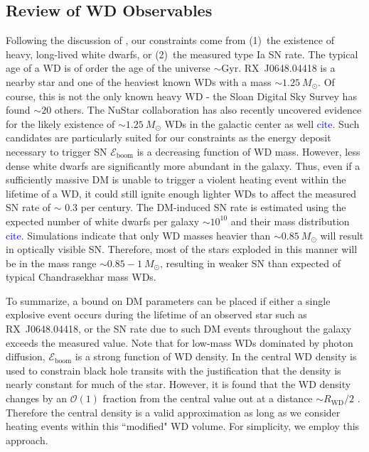 \documentclass[twocolumn,showpacs,preprintnumbers,amsmath,amssymb,prd]{revtex4}
\newcommand{\Eboom}{\mathcal{E}_\text{boom}}
\newcommand{\OO}{\mathcal{O}}
\begin{document}
\subsection{Review of WD Observables}
Following the discussion of \cite{Graham:2015apa}, our constraints come from (1)~the existence of heavy, long-lived white dwarfs, or (2)~the measured type Ia SN rate. 
The typical age of a WD is of order the age of the universe $\sim \text{Gyr}$.
RX~J0648.04418 is a nearby star and one of the heaviest known WDs with a mass $\sim 1.25 ~M_{\odot}$. 
Of course, this is not the only known heavy WD - the Sloan Digital Sky Survey has found $\sim 20$ others. 
The NuStar collaboration has also recently uncovered evidence for the likely existence of $\sim 1.25 ~M_{\odot}$ WDs in the galactic center as well \textcolor{blue}{cite}.
Such candidates are particularly suited for our constraints as the energy deposit necessary to trigger SN $\Eboom$ is a decreasing function of WD mass. 
However, less dense white dwarfs are significantly more abundant in the galaxy.
Thus, even if a sufficiently massive DM is unable to trigger a violent heating event within the lifetime of a WD, it could still ignite enough lighter WDs to affect the measured SN rate of $\sim $ 0.3 per century.
The DM-induced SN rate is estimated using the expected number of white dwarfs per galaxy $\sim 10^{10}$ and their mass distribution \textcolor{blue}{cite}.
Simulations indicate that only WD masses heavier than $\sim 0.85 ~M_{\odot}$ will result in optically visible SN.
Therefore, most of the stars exploded in this manner will be in the mass range $\sim 0.85 - 1 ~M_{\odot}$, resulting in weaker SN than expected of typical Chandrasekhar mass WDs.

To summarize, a bound on DM parameters can be placed if either a single explosive event occurs during the lifetime of an observed star such as RX~J0648.04418, or the SN rate due to such DM events throughout the galaxy exceeds the measured value.
Note that for low-mass WDs dominated by photon diffusion, $\Eboom$ is a strong function of WD density. 
In \cite{Graham:2015apa} the central WD density is used to constrain black hole transits with the justification that the density is nearly constant for much of the star.
However, it is found that the WD density changes by an $\OO(1)$ fraction from the central value out at a distance $\sim R_\text{WD}/2$ \cite{Chandrasekhar}. 
Therefore the central density is a valid approximation as long as we consider heating events within this ``modified" WD volume. 
For simplicity, we employ this approach.  
\end{document}
